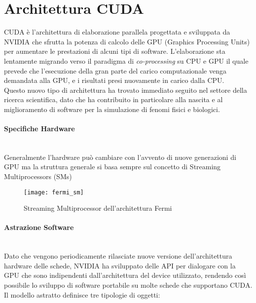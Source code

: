\section{Architettura CUDA}

CUDA è l'architettura di elaborazione parallela progettata e sviluppata da
NVIDIA che sfrutta la potenza di calcolo delle GPU (Graphics Processing Units)
per aumentare le prestazioni di alcuni tipi di software.
L'elaborazione sta lentamente migrando verso il paradigma di
\textit{co-processing} su CPU e GPU il quale prevede che l'esecuzione della
gran parte del carico computazionale venga demandata alla GPU, e i risultati
presi nuovamente in carico dalla CPU.
\\
Questo nuovo tipo di architettura ha trovato immediato seguito nel settore
della ricerca scientifica, dato che ha contribuito in particolare alla nascita
e al miglioramento di software per la simulazione di fenomi fisici e
biologici.

\paragraph{Specifiche Hardware}\mbox{}
\\
Generalmente l'hardware può cambiare con l'avvento di
nuove generazioni di GPU ma la struttura generale si basa sempre sul concetto di
Streaming Multiprocessors (SMs) \cite{nickolls2010gpu}

\begin{figure}[H]
    \centering
    \texttt{[image: fermi\_sm]}
    \caption{Streaming Multiprocessor dell'architettura Fermi 
        \cite{nickolls2010gpu}}
\end{figure}

\paragraph{Astrazione Software}\mbox{}
\\
Dato che vengono periodicamente rilasciate nuove versione dell'architettura
hardware delle schede, NVIDIA ha sviluppato delle API per dialogare con la GPU
che sono indipendenti dall'architettura del device utilizzato, rendendo
così possibile lo sviluppo di software portabile su molte schede che
supportano CUDA.
\\
Il modello astratto definisce tre tipologie di oggetti:

